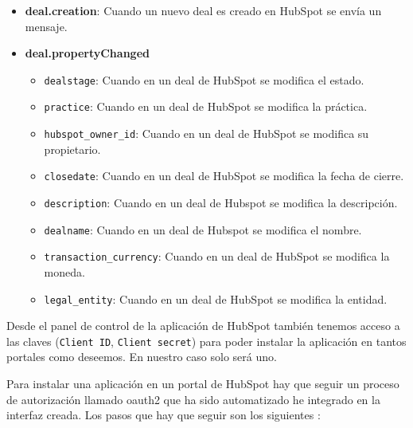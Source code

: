 \begin{itemize}
	\item \textbf{deal.creation}: Cuando un nuevo deal es creado en HubSpot se envía un mensaje.
	\item \textbf{deal.propertyChanged} 
		\begin{itemize}
			\item \verb|dealstage|: Cuando en un deal de HubSpot se modifica el estado.
			\item \verb|practice|: Cuando en un deal de HubSpot se modifica la práctica.
			\item \verb|hubspot_owner_id|: Cuando en un deal de HubSpot se modifica su propietario.
			\item \verb|closedate|: Cuando en un deal de HubSpot se modifica la fecha de cierre.
			\item \verb|description|: Cuando en un deal de Hubspot se modifica la descripción.
			\item \verb|dealname|: Cuando en un deal de Hubspot se modifica el nombre.
			\item \verb|transaction_currency|: Cuando en un deal de HubSpot se modifica la moneda.
			\item \verb|legal_entity|: Cuando en un deal de HubSpot se modifica la entidad.
		\end{itemize}
\end{itemize}

Desde el panel de control de la aplicación de HubSpot también tenemos acceso a las claves (\verb|Client ID|, \verb|Client secret|) para poder instalar la aplicación en tantos portales como deseemos. En nuestro caso solo será uno.


Para instalar una aplicación en un portal de HubSpot hay que seguir un proceso de autorización llamado \gls{oauth2} que ha sido automatizado he integrado en la interfaz creada. 
Los pasos que hay que seguir son los siguientes \cite{hsapi}:

